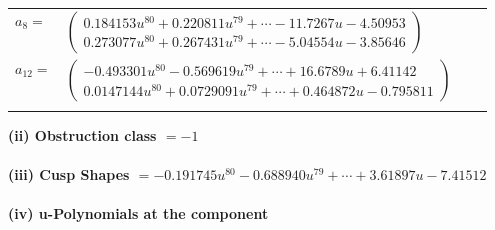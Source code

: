 \documentclass[1p]{elsarticle_modified}
\theoremstyle{definition}
\begin{document}
\begin{tabular}{m{7pt} m{180pt} m{7pt} m{180pt} }
\flushright $a_{8}=$&$\begin{pmatrix}0.184153 u^{80}+0.220811 u^{79}+\cdots-11.7267 u-4.50953\\0.273077 u^{80}+0.267431 u^{79}+\cdots-5.04554 u-3.85646\end{pmatrix}$ \\
\flushright $a_{12}=$&$\begin{pmatrix}-0.493301 u^{80}-0.569619 u^{79}+\cdots+16.6789 u+6.41142\\0.0147144 u^{80}+0.0729091 u^{79}+\cdots+0.464872 u-0.795811\end{pmatrix}$\\&\end{tabular}
\flushleft \textbf{(ii) Obstruction class $= -1$}\\~\\
\flushleft \textbf{(iii) Cusp Shapes $= -0.191745 u^{80}-0.688940 u^{79}+\cdots+3.61897 u-7.41512$}\\~\\
\newpage\renewcommand{\arraystretch}{1}
\flushleft \textbf{(iv) u-Polynomials at the component}\newline \\
\end{document}
